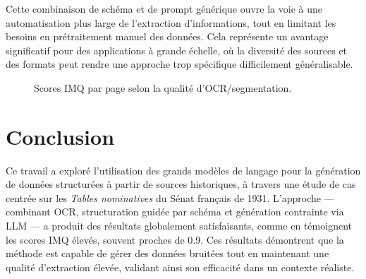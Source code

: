 Cette combinaison de schéma et de prompt générique ouvre la voie à une automatisation plus large de l'extraction d'informations, tout en limitant les besoins en prétraitement manuel des données. Cela représente un avantage significatif pour des applications à grande échelle, où la diversité des sources et des formats peut rendre une approche trop spécifique difficilement généralisable.

\begin{figure}[h]
	\centering
	\caption{Scores IMQ par page selon la qualité d’OCR/segmentation.}
	\label{fig:imq_par_page}
\end{figure}


\section{Conclusion}

Ce travail a exploré l’utilisation des grands modèles de langage pour la génération de données structurées à partir de sources historiques, à travers une étude de cas centrée sur les \emph{Tables nominatives} du Sénat français de 1931. L’approche — combinant OCR, structuration guidée par schéma et génération contrainte via LLM — a produit des résultats globalement satisfaisants, comme en témoignent les scores IMQ élevés, souvent proches de 0.9. Ces résultats démontrent que la méthode est capable de gérer des données bruitées tout en maintenant une qualité d'extraction élevée, validant ainsi son efficacité dans un contexte réaliste.

